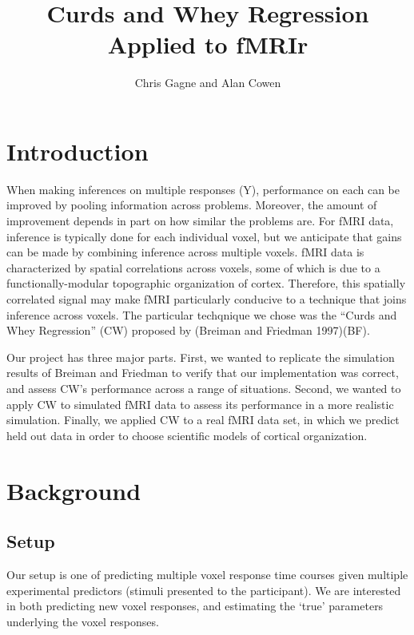 \documentclass{article}
\title{Curds and Whey Regression Applied to
fMRIr}
\author{Chris Gagne and Alan Cowen}
\begin{document}
    
    
    \maketitle
    
    

    



    

\section{Introduction}\label{introduction}

When making inferences on multiple responses (Y), performance on each
can be improved by pooling information across problems. Moreover, the
amount of improvement depends in part on how similar the problems are.
For fMRI data, inference is typically done for each individual voxel,
but we anticipate that gains can be made by combining inference across
multiple voxels. fMRI data is characterized by spatial correlations
across voxels, some of which is due to a functionally-modular
topographic organization of cortex. Therefore, this spatially correlated
signal may make fMRI particularly conducive to a technique that joins
inference across voxels. The particular techqnique we chose was the
``Curds and Whey Regression'' (CW) proposed by (Breiman and Friedman
1997)(BF).

Our project has three major parts. First, we wanted to replicate the
simulation results of Breiman and Friedman to verify that our
implementation was correct, and assess CW's performance across a range
of situations. Second, we wanted to apply CW to simulated fMRI data to
assess its performance in a more realistic simulation. Finally, we
applied CW to a real fMRI data set, in which we predict held out data in
order to choose scientific models of cortical organization.

\section{Background}\label{background}

\subsection{Setup}\label{setup}

Our setup is one of predicting multiple voxel response time courses
given multiple experimental predictors (stimuli presented to the
participant). We are interested in both predicting new voxel responses,
and estimating the `true' parameters underlying the voxel responses.
\end{document}
